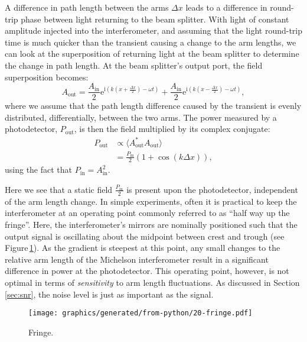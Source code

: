 A difference in path length between the arms $\Delta x$ leads to a difference in round-trip phase between light returning to the beam splitter. With light of constant amplitude injected into the interferometer, and assuming that the light round-trip time is much quicker than the transient causing a change to the arm lengths, we can look at the superposition of returning light at the beam splitter to determine the change in path length. At the beam splitter's output port, the field superposition becomes:
\begin{equation}
  A_{\text{out}} = \frac{A_{\text{in}}}{2} \text{e}^{\text{i} \left( k \left( x + \frac{\Delta x}{2} \right) - \omega t \right)} + \frac{A_{\text{in}}}{2} \text{e}^{\text{i} \left( k \left( x - \frac{\Delta x}{2} \right) - \omega t \right)},
\end{equation}
where we assume that the path length difference caused by the transient is evenly distributed, differentially, between the two arms. The power measured by a photodetector, $P_{\text{out}}$, is then the field multiplied by its complex conjugate:
\begin{equation}
  \label{eq:mich-p-out}
  \begin{split}
    P_{\text{out}} &\propto \langle A_{\text{out}}^*A_{\text{out}} \rangle \\
                   &= \frac{P_{\text{in}}}{2} \left( 1 + \cos \left( k \Delta x \right) \right),
  \end{split}
\end{equation}
using the fact that $P_{\text{in}} = A_{\text{in}}^2$.

Here we see that a static field $\frac{P_{\text{in}}}{2}$ is present upon the photodetector, independent of the arm length change. In simple experiments, often it is practical to keep the interferometer at an operating point commonly referred to as ``half way up the fringe''. Here, the interferometer's mirrors are nominally positioned such that the output signal is oscillating about the midpoint between crest and trough (see Figure\,\ref{fig:fringe}). As the gradient is steepest at this point, any small changes to the relative arm length of the Michelson interferometer result in a significant difference in power at the photodetector. This operating point, however, is not optimal in terms of \emph{sensitivity} to arm length fluctuations. As discussed in Section\,\ref{sec:snr}, the noise level is just as important as the signal.

\begin{figure}
  \centering
  \texttt{[image: graphics/generated/from-python/20-fringe.pdf]}
  \caption{Fringe.}
  \label{fig:fringe}
\end{figure}

